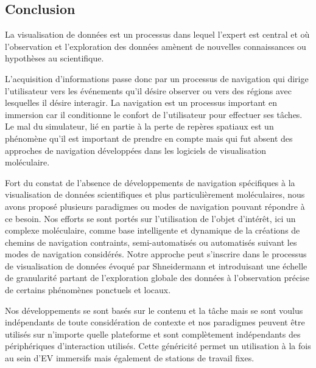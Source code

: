 \subsection{Conclusion}

La visualisation de données est un processus dans lequel l'expert est central et où   l'observation et l'exploration des données amènent de nouvelles connaissances ou hypothèses au scientifique. %

L'acquisition d'informations passe donc par un processus de navigation qui dirige l'utilisateur vers les événements qu'il désire observer ou vers des régions avec lesquelles il désire interagir. La navigation est un processus important en immersion car il conditionne le confort de l'utilisateur pour effectuer ses tâches. Le mal du simulateur, lié en partie à la perte de repères spatiaux est un phénomène qu'il est important de prendre en compte mais qui fut absent des approches de navigation développées dans les logiciels  de visualisation moléculaire. %

Fort du constat de l'absence de développements de navigation spécifiques à la visualisation de données scientifiques et plus particulièrement moléculaires, nous avons proposé plusieurs paradigmes ou modes de navigation pouvant répondre à ce besoin. Nos efforts se sont portés sur l'utilisation de l'objet d'intérêt, ici un complexe moléculaire, comme base intelligente et dynamique de la créations de chemins de navigation contraints, semi-automatisés ou automatisés suivant les modes de navigation considérés. Notre approche peut s'inscrire dans le processus de visualisation de données évoqué par Shneidermann et introduisant une échelle de granularité partant de l'exploration globale des données à l'observation précise de certains phénomènes ponctuels et locaux.

Nos développements se sont basés sur le contenu et la tâche mais se sont voulus indépendants de toute considération de contexte et nos paradigmes peuvent être utilisés sur n'importe quelle plateforme et sont complètement indépendants des périphériques d'interaction utilisés. Cette généricité permet un utilisation à la fois au sein d'EV immersifs mais également de stations de travail fixes.

